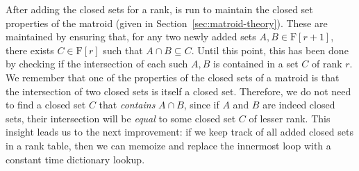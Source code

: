 After adding the closed sets for a rank,  is run to maintain the closed set properties of the matroid (given in Section~\ref{sec:matroid-theory}). These are maintained by ensuring that, for any two newly added sets $A,B \in \mathrm{F}[r+1]$, there exists $C \in \mathrm{F}[r]$ such that $A \cap B \subseteq C$. Until this point, this has been done by checking if the intersection of each such $A,B$ is contained in a set $C$ of rank $r$. We remember that one of the properties of the closed sets of a matroid is that the intersection of two closed sets is itself a closed set. Therefore, we do not need to find a closed set $C$ that \textit{contains} $A \cap B$, since if $A$ and $B$ are indeed closed sets, their intersection will be \textit{equal} to some closed set $C$ of lesser rank. This insight leads us to the next improvement: if we keep track of all added closed sets in a rank table, then we can memoize  and replace the innermost loop with a constant time dictionary lookup.

